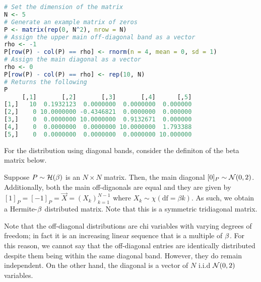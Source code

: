 \begin{lstlisting}[language=R]
# Set the dimension of the matrix
N <- 5
# Generate an example matrix of zeros
P <- matrix(rep(0, N^2), nrow = N)
# Assign the upper main off-diagonal band as a vector
rho <- -1
P[row(P) - col(P) == rho] <- rnorm(n = 4, mean = 0, sd = 1)
# Assign the main diagonal as a vector
rho <- 0
P[row(P) - col(P) == rho] <- rep(10, N)
# Returns the following
P
     [,1]       [,2]       [,3]       [,4]      [,5]
[1,]   10  0.1932123  0.0000000  0.0000000  0.000000
[2,]    0 10.0000000 -0.4346821  0.0000000  0.000000
[3,]    0  0.0000000 10.0000000  0.9132671  0.000000
[4,]    0  0.0000000  0.0000000 10.0000000  1.793388
[5,]    0  0.0000000  0.0000000  0.0000000 10.000000
\end{lstlisting}


%
%

For the distribution using diagonal bands, consider the definiton of the beta matrix below. %

\ALGbeta


\begin{definition}
Suppose $P \sim \mathcal{H}(\beta)$ is an $N \times N$ matrix. Then, the main diagonal $[0]_P \sim \mathcal{N}(0,2)$.
Additionally, both the main off-digaonals are equal and they are given by $[1]_{P} = [-1]_{P} = \vec{X} = (X_k)_{k=1}^{N-1}$ where $X_k \sim \chi(\text{df} = \beta k)$.
As such, we obtain a Hermite-$\beta$ distributed matrix. Note that this is a symmetric tridiagonal matrix.
\end{definition}

\begin{remark}
Note that the off-diagonal distributions are chi variables with varying degrees of freedom; in fact it is an increasing linear sequence that is a multiple of $\beta$.
For this reason, we cannot say that the off-diagonal entries are identically distributed despite them being within the same diagonal band. However, they do remain independent.
On the other hand, the diagonal is a vector of $N$ i.i.d $\mathcal{N}(0,2)$ variables.
\end{remark}

